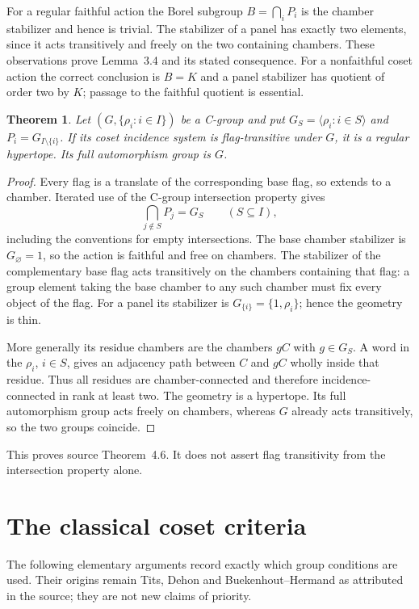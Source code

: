 \documentclass[11pt,a4paper]{article}
\newtheorem{theorem}{Theorem}[section]
\newcommand{\gen}[1]{\langle#1\rangle}
\begin{document}
For a regular faithful action the Borel subgroup
$B=\bigcap_iP_i$ is the chamber stabilizer and hence is trivial.  The
stabilizer of a panel has exactly two elements, since it acts transitively
and freely on the two containing chambers.  These observations prove
Lemma~3.4 and its stated consequence.  For a nonfaithful coset action the
correct conclusion is $B=K$ and a panel stabilizer has quotient of order
two by $K$; passage to the faithful quotient is essential.

\begin{theorem}\label{thm:converse}
Let $(G,\{\rho_i:i\in I\})$ be a C-group and put
$G_S=\gen{\rho_i:i\in S}$ and $P_i=G_{I\setminus\{i\}}$.
If its coset incidence system is flag-transitive under $G$, it is a
regular hypertope.  Its full automorphism group is $G$.
\end{theorem}
\begin{proof}
Every flag is a translate of the corresponding base flag, so extends
to a chamber.  Iterated use of the C-group intersection property gives
\[
                  \bigcap_{j\notin S}P_j=G_S
                  \qquad(S\subseteq I),
\]
including the conventions for empty intersections.  The base chamber
stabilizer is $G_\varnothing=1$, so the action is faithful and free
on chambers.  The stabilizer of the complementary base flag acts
transitively on the chambers containing that flag: a group element taking
the base chamber to any such chamber must fix every object of the flag.
For a panel its stabilizer is $G_{\{i\}}=\{1,\rho_i\}$; hence the
geometry is thin.

More generally its residue chambers are the chambers $gC$ with
$g\in G_S$.  A word in the $\rho_i$, $i\in S$, gives an adjacency path
between $C$ and $gC$ wholly inside that residue.  Thus all residues
are chamber-connected and therefore incidence-connected in rank at
least two.  The geometry is a hypertope.  Its full automorphism group
acts freely on chambers, whereas $G$ already acts transitively, so the
two groups coincide.
\end{proof}
This proves source Theorem~4.6.  It does not assert flag transitivity
from the intersection property alone.

\section{The classical coset criteria}

The following elementary arguments record exactly which group conditions
are used.  Their origins remain Tits, Dehon and Buekenhout--Hermand as
attributed in the source; they are not new claims of priority.
\end{document}
